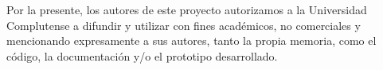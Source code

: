 Por la presente, los autores de este proyecto autorizamos a la Universidad Complutense a difundir y utilizar con fines académicos, no comerciales y
mencionando expresamente a sus autores, tanto la propia memoria, como el código, la documentación y/o el prototipo desarrollado.
